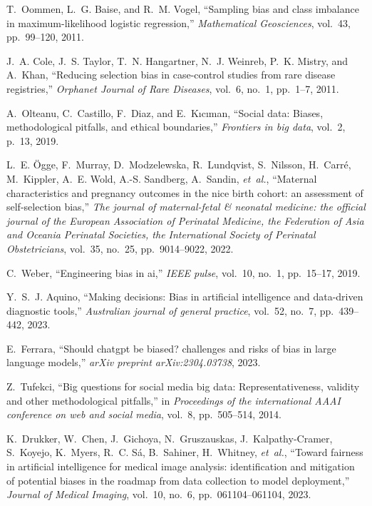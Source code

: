 \documentclass{article}
\begin{document}
\begin{thebibliography}{100}
	T.~Oommen, L.~G. Baise, and R.~M. Vogel, ``Sampling bias and class imbalance in
	maximum-likelihood logistic regression,'' {\em Mathematical Geosciences},
	vol.~43, pp.~99--120, 2011.
	
	J.~A. Cole, J.~S. Taylor, T.~N. Hangartner, N.~J. Weinreb, P.~K. Mistry, and
	A.~Khan, ``Reducing selection bias in case-control studies from rare disease
	registries,'' {\em Orphanet Journal of Rare Diseases}, vol.~6, no.~1,
	pp.~1--7, 2011.
	
	A.~Olteanu, C.~Castillo, F.~Diaz, and E.~K{\i}c{\i}man, ``Social data: Biases,
	methodological pitfalls, and ethical boundaries,'' {\em Frontiers in big
		data}, vol.~2, p.~13, 2019.
	
	L.~E. {\"O}gge, F.~Murray, D.~Modzelewska, R.~Lundqvist, S.~Nilsson,
	H.~Carr{\'e}, M.~Kippler, A.~E. Wold, A.-S. Sandberg, A.~Sandin, {\em
		et~al.}, ``Maternal characteristics and pregnancy outcomes in the nice birth
	cohort: an assessment of self-selection bias,'' {\em The journal of
		maternal-fetal \& neonatal medicine: the official journal of the European
		Association of Perinatal Medicine, the Federation of Asia and Oceania
		Perinatal Societies, the International Society of Perinatal Obstetricians},
	vol.~35, no.~25, pp.~9014--9022, 2022.
	
	C.~Weber, ``Engineering bias in ai,'' {\em IEEE pulse}, vol.~10, no.~1,
	pp.~15--17, 2019.
	
	Y.~S.~J. Aquino, ``Making decisions: Bias in artificial intelligence and
	data-driven diagnostic tools,'' {\em Australian journal of general practice},
	vol.~52, no.~7, pp.~439--442, 2023.
	
	E.~Ferrara, ``Should chatgpt be biased? challenges and risks of bias in large
	language models,'' {\em arXiv preprint arXiv:2304.03738}, 2023.
	
	Z.~Tufekci, ``Big questions for social media big data: Representativeness,
	validity and other methodological pitfalls,'' in {\em Proceedings of the
		international {AAAI} conference on web and social media}, vol.~8,
	pp.~505--514, 2014.
	
	K.~Drukker, W.~Chen, J.~Gichoya, N.~Gruszauskas, J.~Kalpathy-Cramer, S.~Koyejo,
	K.~Myers, R.~C. S{\'a}, B.~Sahiner, H.~Whitney, {\em et~al.}, ``Toward
	fairness in artificial intelligence for medical image analysis:
	identification and mitigation of potential biases in the roadmap from data
	collection to model deployment,'' {\em Journal of Medical Imaging}, vol.~10,
	no.~6, pp.~061104--061104, 2023.
	

\end{thebibliography}
\end{document}
